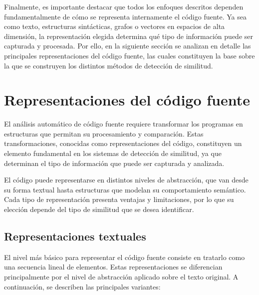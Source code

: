 Finalmente, es importante destacar que todos los enfoques descritos dependen fundamentalmente de cómo se representa internamente el código fuente. Ya sea como texto, estructuras sintácticas, grafos o vectores en espacios de alta dimensión, la representación elegida determina qué tipo de información puede ser capturada y procesada. Por ello, en la siguiente sección se analizan en detalle las principales representaciones del código fuente, las cuales constituyen la base sobre la que se construyen los distintos métodos de detección de similitud.

\section{Representaciones del código fuente}

El análisis automático de código fuente requiere transformar los programas en estructuras que permitan su procesamiento y comparación. Estas transformaciones, conocidas como representaciones del código, constituyen un elemento fundamental en los sistemas de detección de similitud, ya que determinan el tipo de información que puede ser capturada y analizada.

El código puede representarse en distintos niveles de abstracción, que van desde su forma textual hasta estructuras que modelan su comportamiento semántico. Cada tipo de representación presenta ventajas y limitaciones, por lo que su elección depende del tipo de similitud que se desea identificar.


\subsection{Representaciones textuales}

El nivel más básico para representar el código fuente consiste en tratarlo como una secuencia lineal de elementos. Estas representaciones se diferencian principalmente por el nivel de abstracción aplicado sobre el texto original. A continuación, se describen las principales variantes:

